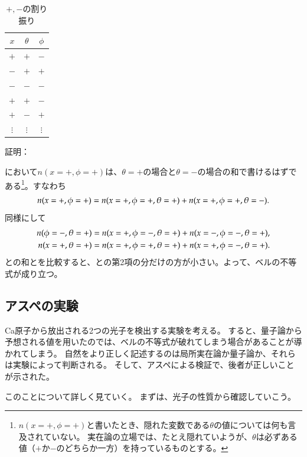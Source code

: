 \documentclass[10pt,b5paper,papersize,dvipdfmx]{jsbook}
\begin{document}
\begin{table}[htbp]
  \centering
  \caption{$+, -$の割り振り}
  \label{tab:pm}
  \begin{tabular}{ccc} \hline
    $x$ & $\theta$ & $\phi$ \\ \hline
    $+$ & $+$ & $-$ \\
    $-$ & $+$ & $+$ \\
    $-$ & $-$ & $-$ \\
    $+$ & $+$ & $-$ \\
    $+$ & $-$ & $+$ \\
    $\vdots$ & $\vdots$ & $\vdots$ \\ \hline
  \end{tabular}
\end{table}

\noindent 証明：\par
{}において$n(x=+,\phi=+)$は、$\theta = +$の場合と$\theta = -$の場合の和で書けるはずである\footnote{
  $n(x=+,\phi=+)$と書いたとき、隠れた変数である$\theta$の値については何も言及されていない。
  実在論の立場では、たとえ隠れていようが、$\theta$は必ずある値（$+$か$-$のどちらか一方）を持っているものとする。
}。すなわち
\begin{align}
  \label{eq:bell-1}
  n(x=+,\phi=+) = \textcolor{red}{n(x=+,\phi=+, \theta=+)} + n(x=+,\phi=+, \theta=-).
\end{align}
同様にして
\begin{align}
  \label{eq:bell-2}
  n(\phi=-,\theta=+) &= \textcolor{blue}{n(x=+, \phi=-,\theta=+)} + n(x=-, \phi=-,\theta=+)
  , \\
  \label{eq:bell-3}
  n(x=+,\theta=+) &= \textcolor{red}{n(x=+, \phi=+, \theta=+)} + \textcolor{blue}{n(x=+, \phi=-, \theta=+)}.
\end{align}
との和とを比較すると、との第2項の分だけの方が小さい。よって、ベルの不等式が成り立つ。
\QED

%
\subsection{アスペの実験} %
Ca原子から放出される2つの光子を検出する実験を考える。
すると、量子論から予想される値を用いたのでは、ベルの不等式が破れてしまう場合があることが導かれてしまう。
自然をより正しく記述するのは局所実在論か量子論か、それらは実験によって判断される。
そして、アスペによる検証で、後者が正しいことが示された。\par
このことについて詳しく見ていく。
まずは、光子の性質から確認していこう。
\end{document}
